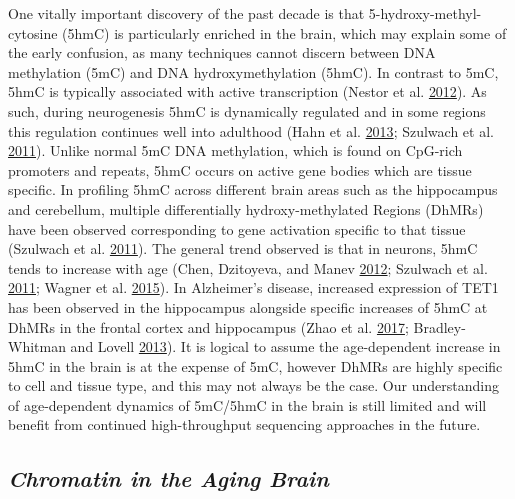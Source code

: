 \documentclass[onehalf,12pt]{beavtex}
\begin{document}
  One vitally important discovery of the past decade is that
  5-hydroxy-methyl-cytosine (5hmC) is particularly enriched in the brain,
  which may explain some of the early confusion, as many techniques cannot
  discern between DNA methylation (5mC) and DNA hydroxymethylation (5hmC).
  In contrast to 5mC, 5hmC is typically associated with active
  transcription (Nestor et al.
  \protect\hyperlink{ref-NestorTissuetypemajor2012}{2012}). As such,
  during neurogenesis 5hmC is dynamically regulated and in some regions
  this regulation continues well into adulthood (Hahn et al.
  \protect\hyperlink{ref-HahnDynamics5HydroxymethylcytosineChromatin2013}{2013};
  Szulwach et al.
  \protect\hyperlink{ref-Szulwach5hmCmediatedepigenetic2011}{2011}).
  Unlike normal 5mC DNA methylation, which is found on CpG-rich promoters
  and repeats, 5hmC occurs on active gene bodies which are tissue
  specific. In profiling 5hmC across different brain areas such as the
  hippocampus and cerebellum, multiple differentially hydroxy-methylated
  Regions (DhMRs) have been observed corresponding to gene activation
  specific to that tissue (Szulwach et al.
  \protect\hyperlink{ref-Szulwach5hmCmediatedepigenetic2011}{2011}). The
  general trend observed is that in neurons, 5hmC tends to increase with
  age (Chen, Dzitoyeva, and Manev
  \protect\hyperlink{ref-ChenEffectaging5hydroxymethylcytosine2012}{2012};
  Szulwach et al.
  \protect\hyperlink{ref-Szulwach5hmCmediatedepigenetic2011}{2011}; Wagner
  et al.
  \protect\hyperlink{ref-WagnerAgeDependentLevels5Methyl2015}{2015}). In
  Alzheimer's disease, increased expression of TET1 has been observed in
  the hippocampus alongside specific increases of 5hmC at DhMRs in the
  frontal cortex and hippocampus (Zhao et al.
  \protect\hyperlink{ref-Zhaogenomewideprofilingbrain2017}{2017};
  Bradley-Whitman and Lovell
  \protect\hyperlink{ref-Bradley-WhitmanEpigeneticchangesprogression2013}{2013}).
  It is logical to assume the age-dependent increase in 5hmC in the brain
  is at the expense of 5mC, however DhMRs are highly specific to cell and
  tissue type, and this may not always be the case. Our understanding of
  age-dependent dynamics of 5mC/5hmC in the brain is still limited and
  will benefit from continued high-throughput sequencing approaches in the
  future.
  
  \subsection{\texorpdfstring{\emph{Chromatin in the Aging
  Brain}}{Chromatin in the Aging Brain}}\label{chraging}
  
\end{document}
